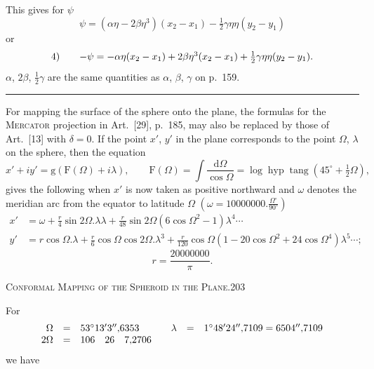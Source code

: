This gives for $\psi$
\[
\psi=(\alpha\eta-2\beta\eta^3)(x_2-x_1)-\tfrac12\gamma\eta\eta(y_2-y_1)
\]
or
\[
\begin{array}{r@{\qquad}l}
4)&-\psi=-\alpha\eta(x_2-x_1)+2\beta\eta^3(x_2-x_1)+\tfrac12\gamma\eta\eta(y_2-y_1).
\end{array}
\]
$\alpha$, $2\beta$, $\tfrac12\gamma$ are the same quantities as $\alpha$, $\beta$, $\gamma$ on p.~159.
\begin{center}\rule{4cm}{.4pt}\end{center}
\bigskip
For mapping the surface of the sphere onto the plane, the formulas for the \textsc{Mercator} projection in Art.~[29], p.~185, may also be replaced by those of Art.~[13] with $\delta=0$. If the point $x'$, $y'$ in the plane corresponds to the point $\Omega$, $\lambda$ on the sphere, then the equation
\[
x'+iy'=\mathrm g(\mathrm F(\Omega)+i\lambda),\qquad
\mathrm F(\Omega)=\int\frac{\mathrm d\Omega}{\cos\Omega}
=\log\operatorname{hyp}\operatorname{tang}(45^\circ+\tfrac12\Omega),
\]
gives the following when $x'$ is now taken as positive northward and $\omega$ denotes the meridian arc from the equator to latitude $\Omega$ $\left(\omega=10000000.\frac{\Omega^\circ}{90^\circ}\right)$
\[
\begin{aligned}
x'&=\omega+\frac r4\sin2\Omega.\lambda\lambda+\frac r{48}\sin2\Omega(6\cos\Omega^2-1)\lambda^4\cdots\\
y'&=r\cos\Omega.\lambda+\frac r6\cos\Omega\cos2\Omega.\lambda^3
+\frac r{120}\cos\Omega(1-20\cos\Omega^2+24\cos\Omega^4)\lambda^5\cdots;
\end{aligned}
\]
\[
r=\frac{20000000}{\pi}.
\]
\par\endgroup
\clearpage
\noindent\mbox{}\hfill\textsc{Conformal Mapping of the Spheroid in the Plane.}\hfill203\par\medskip
\begingroup\footnotesize
For
\[
\begin{array}{rcl@{\qquad}rcl}
\Omega&=&53^\circ13'3''{,}6353&\lambda&=&1^\circ48'24''{,}7109=6504''{,}7109\\
2\Omega&=&106\quad26\quad7{,}2706&&&
\end{array}
\]
we have
